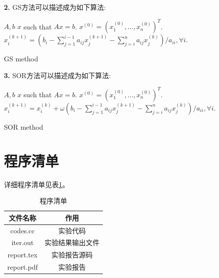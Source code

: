 \documentclass{article}
\theoremstyle{plain}
\theoremstyle{definition}
\theoremstyle{remark}
\begin{document}
    \textbf{2.} GS方法可以描述成为如下算法:
    \begin{algorithm}[!h]
        \centering
        \begin{algorithmic}[1]
            \Require $A,b$
            \Ensure $x$ such that $Ax = b$.
                \State $x^{(0)} = (x_1^{(0)},\dots,x_n^{(0)})^T$.
                    \State $x_i^{(k+1)} = (b_i - \sum_{j=1}^{i-1}a_{ij}x_j^{(k+1)} - \sum_{j=i}^na_{ij}x_j^{(k)})/a_{ii},\forall i$.
                \EndFor
            \EndProcedure
        \end{algorithmic}
        \caption{GS method}
        \label{gs}
    \end{algorithm}
    
    \textbf{3.} SOR方法可以描述成为如下算法:
    \begin{algorithm}[!h]
        \centering
        \begin{algorithmic}[1]
            \Require $A,b$
            \Ensure $x$ such that $Ax = b$.
                \State $x^{(0)} = (x_1^{(0)},\dots,x_n^{(0)})^T$.
                    \State $x_i^{(k+1)} = x_i^{(k)} + \omega(b_i - \sum_{j=1}^{i-1}a_{ij}x_j^{(k+1)} - \sum_{j=i}^na_{ij}x_j^{(k)})/a_{ii},\forall i$.
                \EndFor
            \EndProcedure
        \end{algorithmic}
        \caption{SOR method}
        \label{sor}
    \end{algorithm}
        
    \section{程序清单}
    详细程序清单见表\ref{list}。
    \begin{table}[!htbp]
        \centering
        \begin{tabular}{c|c}
            \hline
            \hline
            文件名称 & 作用 \\
            \hline
            codes.cc & 实验代码\\
            iter.out & 实验结果输出文件\\
            report.tex & 实验报告源码\\
            report.pdf & 实验报告\\
            \hline
            \hline
        \end{tabular}
        \caption{程序清单}
        \label{list}
    \end{table}
    
\end{document}
